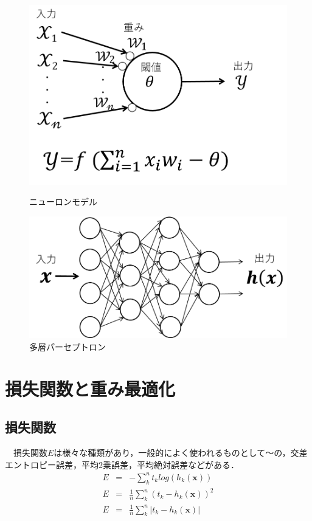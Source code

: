 \begin{figure}[htbp]
	\begin{minipage}{0.5\hsize}
		\begin{center}
			\includegraphics[scale=0.5]{./images/deeplearning/neuron_model.png}
			\caption{ニューロンモデル}
			\label{fig:neuron}
		\end{center}
	\end{minipage}
	\begin{minipage}{0.5\hsize}
		\begin{center}
			\includegraphics[scale=0.5]{./images/deeplearning/tasou.png}
			\caption{多層パーセプトロン}
			\label{fig:tasou}
		\end{center}
	\end{minipage}
\end{figure}

\section{損失関数と重み最適化}
\subsection{損失関数}
　損失関数$E$は様々な種類があり，一般的によく使われるものとして～の，交差エントロピー誤差，平均2乗誤差，平均絶対誤差などがある．
　\begin{eqnarray}
	E &=& -\sum_{k}^{n} t_k log(h_{k}(\bm x)) \label{eq:loss-crossentropy}　\\
	E &=& \frac{1}{n}\sum_{k}^{n}{( t_k - h_{k}(\bm x) )^2} \\
	E &=& \frac{1}{n}\sum_{k}^{n}| t_k - h_{k}(\bm x) | \label{eq:loss-abs}
\end{eqnarray}

